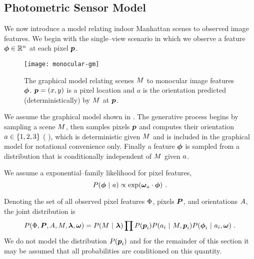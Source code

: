 \subsection{Photometric Sensor Model}

We now introduce a model relating indoor Manhattan scenes to observed
image features. We begin with the single--view scenario in which we
observe a feature $\Feature\in\Reals^n$ at each pixel $\Pixel$.

\begin{figure}[tb]
  \centering
  \texttt{[image: monocular-gm]}
  \caption{The graphical model relating scenes $\Scene$ to monocular
    image features $\Feature$. $\Pixel=(x,y)$ is a pixel location and
    $a$ is the orientation predicted (deterministically) by $\Scene$
    at $\Pixel$.}
  \label{fig:photometric-gm}
\end{figure}

We assume the graphical model shown in . The
generative process begins by sampling a scene $\Scene$, then samples
pixels $\Pixel$ and computes their orientation
$\Orient\in\Orientations$ (\cf
{}), which is deterministic given $\Scene$
and is included in the graphical model for notational convenience
only. Finally a feature $\Feature$ is sampled from a distribution that
is conditionally independent of $\Scene$ given $\Orient$. 

We assume a exponential--family likelihood for pixel features,
\begin{equation}
  \label{eq:pixel-likelihood}
  P(\Feature ~|~ \Orient) \propto
    \exp(\PixelModel_\Orient \cdot \Feature) ~.
\end{equation}

Denoting the set of all observed pixel
features $\Features$, pixels $\Pixels$, and orientations $\Orients$,
the joint distribution is
\begin{equation}
  P(\Features, \Pixels, \Orients, \Scene, \Penalties, \PixelModel) =
    P(\Scene ~|~ \Penalties) 
    \prod P(\Pixel_i)
          P(\Orient_i ~|~ \Scene, \Pixel_i)
          P(\Feature_i ~|~ \Orient_i, \PixelModel) ~.
\end{equation}
We do not model the distribution $P(\Pixel_i)$ and for the remainder
of this section it may be assumed that all probabilities are
conditioned on this quantity.

